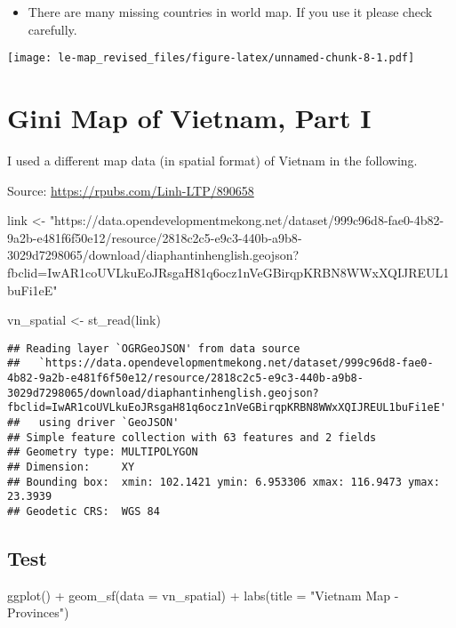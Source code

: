 \documentclass[
]{article}
\newenvironment{Shaded}{\begin{snugshade}}{\end{snugshade}}
\newcommand{\AttributeTok}[1]{\textcolor[rgb]{0.77,0.63,0.00}{#1}}
\newcommand{\FunctionTok}[1]{\textcolor[rgb]{0.00,0.00,0.00}{#1}}
\newcommand{\NormalTok}[1]{#1}
\newcommand{\OtherTok}[1]{\textcolor[rgb]{0.56,0.35,0.01}{#1}}
\newcommand{\SpecialCharTok}[1]{\textcolor[rgb]{0.00,0.00,0.00}{#1}}
\newcommand{\StringTok}[1]{\textcolor[rgb]{0.31,0.60,0.02}{#1}}
\providecommand{\tightlist}{%
  \setlength{\itemsep}{0pt}\setlength{\parskip}{0pt}}
\begin{document}
\begin{itemize}
\tightlist
\item
  There are many missing countries in world map. If you use it please
  check carefully.
\end{itemize}

\texttt{[image: le-map\_revised\_files/figure-latex/unnamed-chunk-8-1.pdf]}

\hypertarget{gini-map-of-vietnam-part-i}{%
\section{Gini Map of Vietnam, Part I}\label{gini-map-of-vietnam-part-i}}

I used a different map data (in spatial format) of Vietnam in the
following.

Source: \url{https://rpubs.com/Linh-LTP/890658}

\begin{Shaded}
\begin{Highlighting}[]
\NormalTok{link }\OtherTok{\textless{}{-}} \StringTok{"https://data.opendevelopmentmekong.net/dataset/999c96d8{-}fae0{-}4b82{-}9a2b{-}e481f6f50e12/resource/2818c2c5{-}e9c3{-}440b{-}a9b8{-}3029d7298065/download/diaphantinhenglish.geojson?fbclid=IwAR1coUVLkuEoJRsgaH81q6ocz1nVeGBirqpKRBN8WWxXQIJREUL1buFi1eE"}

\NormalTok{vn\_spatial }\OtherTok{\textless{}{-}} \FunctionTok{st\_read}\NormalTok{(link)}
\end{Highlighting}
\end{Shaded}

\begin{verbatim}
## Reading layer `OGRGeoJSON' from data source 
##   `https://data.opendevelopmentmekong.net/dataset/999c96d8-fae0-4b82-9a2b-e481f6f50e12/resource/2818c2c5-e9c3-440b-a9b8-3029d7298065/download/diaphantinhenglish.geojson?fbclid=IwAR1coUVLkuEoJRsgaH81q6ocz1nVeGBirqpKRBN8WWxXQIJREUL1buFi1eE' 
##   using driver `GeoJSON'
## Simple feature collection with 63 features and 2 fields
## Geometry type: MULTIPOLYGON
## Dimension:     XY
## Bounding box:  xmin: 102.1421 ymin: 6.953306 xmax: 116.9473 ymax: 23.3939
## Geodetic CRS:  WGS 84
\end{verbatim}

\hypertarget{test}{%
\subsection{Test}\label{test}}

\begin{Shaded}
\begin{Highlighting}[]
\FunctionTok{ggplot}\NormalTok{() }\SpecialCharTok{+} 
  \FunctionTok{geom\_sf}\NormalTok{(}\AttributeTok{data =}\NormalTok{ vn\_spatial) }\SpecialCharTok{+} 
  \FunctionTok{labs}\NormalTok{(}\AttributeTok{title =} \StringTok{"Vietnam Map {-} Provinces"}\NormalTok{)}
\end{Highlighting}
\end{Shaded}
\end{document}
